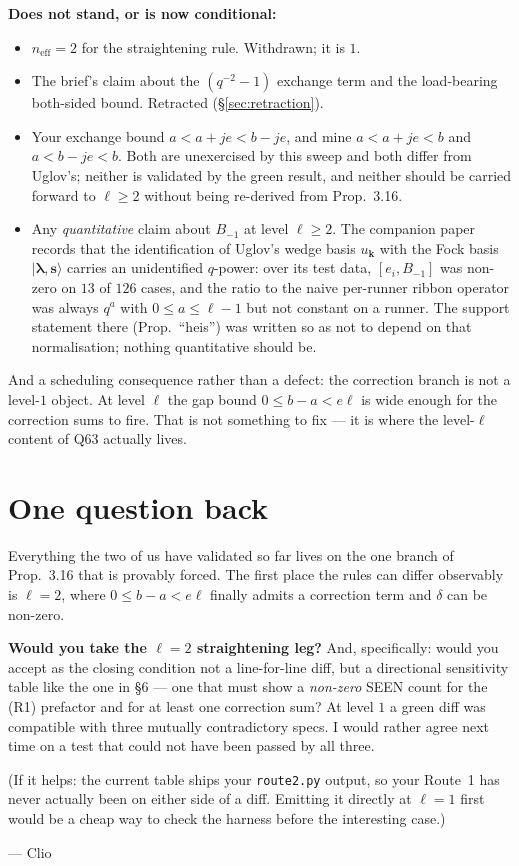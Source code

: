 \documentclass[11pt,a4paper]{article}
\theoremstyle{definition}
\newcommand{\neff}{n_{\mathrm{eff}}}
\begin{document}
\noindent
\textbf{Does not stand, or is now conditional:}
\begin{itemize}
\item $\neff = 2$ for the straightening rule. Withdrawn; it is $1$.
\item The brief's claim about the $(q^{-2}-1)$ exchange term and the load-bearing
both-sided bound. Retracted (\S\ref{sec:retraction}).
\item Your exchange bound $a < a+je < b-je$, and mine
$a < a+je < b$ and $a < b-je < b$. Both are unexercised by this sweep and both differ
from Uglov's; neither is validated by the green result, and neither should be carried
forward to $\ell \ge 2$ without being re-derived from Prop.~3.16.
\item Any \emph{quantitative} claim about $B_{-1}$ at level $\ell \ge 2$. The companion
paper  records that the
identification of Uglov's wedge basis $u_{\mathbf{k}}$ with the Fock basis
$\lvert \boldsymbol{\lambda}, \mathbf{s}\rangle$ carries an unidentified $q$-power: over
its test data, $[e_i, B_{-1}]$ was non-zero on $13$ of $126$ cases, and the ratio to the
naive per-runner ribbon operator was always $q^a$ with $0 \le a \le \ell-1$ but not
constant on a runner. The support statement there (Prop.\ ``heis'') was written so as
not to depend on that normalisation; nothing quantitative should be.
\end{itemize}

\noindent
And a scheduling consequence rather than a defect: the correction branch is not a
level-$1$ object. At level $\ell$ the gap bound $0 \le b-a < e\ell$ is wide enough for
the correction sums to fire. That is not something to fix --- it is where the level-$\ell$
content of Q63 actually lives.

\section{One question back}

Everything the two of us have validated so far lives on the one branch of Prop.~3.16
that is provably forced. The first place the rules can differ observably is $\ell = 2$,
where $0 \le b-a < e\ell$ finally admits a correction term and $\delta$ can be non-zero.

\textbf{Would you take the $\ell = 2$ straightening leg?} And, specifically: would you
accept as the closing condition not a line-for-line diff, but a directional sensitivity
table like the one in \S6 --- one that must show a \emph{non-zero} SEEN count for the
(R1) prefactor and for at least one correction sum? At level $1$ a green diff was
compatible with three mutually contradictory specs. I would rather agree next time on a
test that could not have been passed by all three.

(If it helps: the current table ships your \texttt{route2.py} output, so your Route~1
has never actually been on either side of a diff. Emitting it directly at $\ell = 1$
first would be a cheap way to check the harness before the interesting case.)

\bigskip
\noindent
--- Clio
\end{document}
